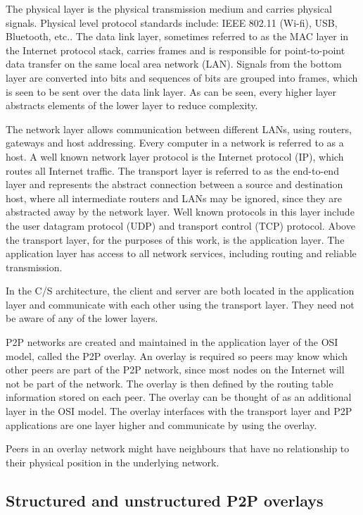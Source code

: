 The physical layer is the physical transmission medium and carries physical signals. Physical level protocol standards include: IEEE 802.11 (Wi-fi), USB, Bluetooth, etc.. The data link layer, sometimes referred to as the MAC layer in the Internet protocol stack, carries frames and is responsible for point-to-point data transfer on the same local area network (LAN). Signals from the bottom layer are converted into bits and sequences of bits are grouped into frames, which is seen to be sent over the data link layer. As can be seen, every higher layer abstracts elements of the lower layer to reduce complexity.

The network layer allows communication between different LANs, using routers, gateways and host addressing. Every computer in a network is referred to as a host. A well known network layer protocol is the Internet protocol (IP), which routes all Internet traffic. The transport layer is referred to as the end-to-end layer and represents the abstract connection between a source and destination host, where all intermediate routers and LANs may be ignored, since they are abstracted away by the network layer. Well known protocols in this layer include the user datagram protocol (UDP) and transport control (TCP) protocol. Above the transport layer, for the purposes of this work, is the application layer. The application layer has access to all network services, including routing and reliable transmission.

In the C/S architecture, the client and server are both located in the application layer and communicate with each other using the transport layer. They need not be aware of any of the lower layers.

P2P networks are created and maintained in the application layer of the OSI model, called the P2P overlay. An overlay is required so peers may know which other peers are part of the P2P network, since most nodes on the Internet will not be part of the network. The overlay is then defined by the routing table information stored on each peer. The overlay can be thought of as an additional layer in the OSI model. The overlay interfaces with the transport layer and P2P applications are one layer higher and communicate by using the overlay.

Peers in an overlay network might have neighbours that have no relationship to their physical position in the underlying network.

\subsection{Structured and unstructured P2P overlays}
\label{overlays}

